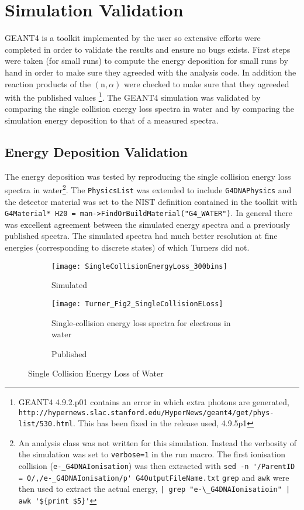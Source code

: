 \section{Simulation Validation}
\label{sec:SimValidation}

GEANT4 is a toolkit implemented by the user so extensive efforts were completed in order to validate the results and ensure no bugs exists.
First steps were taken (for small runs) to compute the energy deposition for small runs by hand in order to make sure they agreeded with the analysis code.
In addition the reaction products of the $(\text{n},\alpha)$ were checked to make sure that they agreeded with the published values \footnote{GEANT4 4.9.2.p01 contains an error in which extra photons are generated, \verb+http://hypernews.slac.stanford.edu/HyperNews/geant4/get/phys-list/530.html+. This has been fixed in the release used, 4.9.5p1}.
The GEANT4 simulation was validated by comparing the single collision energy loss spectra in water and by comparing the simulation energy deposition to that of a measured spectra.


\subsection{Energy Deposition Validation}
The energy deposition was tested by reproducing the single collision energy loss spectra in water\footnote{%
An analysis class was not written for this simulation. 
Instead the verbosity of the simulation was set to \verb+verbose=1+ in the run macro.
The first ionisation collision (\verb+e-_G4DNAIonisation+) was then extracted with \verb+sed -n '/ParentID = 0/,/e-_G4DNAIonisation/p' G4OutputFileName.txt+ \verb+grep+ and \verb+awk+ were then used to extract the actual energy, \verb+| grep "e-\_G4DNAIonisatioin" | awk '${print $5}'+ %
}.
The \verb+PhysicsList+ was extended to include \verb+G4DNAPhysics+ and the detector material was set to the NIST definition contained in the toolkit with \verb+G4Material* H20 = man->FindOrBuildMaterial("G4_WATER")+.
In general there was excellent agreement between the simulated energy spectra and a previously published spectra\cite{turner_comparative_1982}.
The simulated spectra had much better resolution at fine energies (corresponding to discrete states) of which Turners did not.
\begin{figure}[h]
    \centering
    \begin{subfigure}[b]{0.45\figurewidth}
        \texttt{[image: SingleCollisionEnergyLoss\_300bins]}
        \caption{Simulated}
    \end{subfigure}
    \begin{subfigure}[b]{0.45\figurewidth}
        \texttt{[image: Turner\_Fig2\_SingleCollisionELoss]}
        \caption{Single-collision energy loss spectra for electrons in water \protect\cite{turner_comparative_1982}}
        \caption{Published}
    \end{subfigure}
    \caption{Single Collision Energy Loss of Water}
\end{figure}
